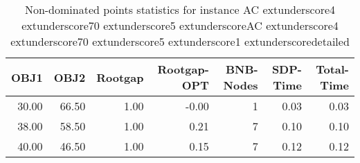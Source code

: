\begin{table}
\caption{Non-dominated points statistics for instance AC	extunderscore4	extunderscore70	extunderscore5	extunderscoreAC	extunderscore4	extunderscore70	extunderscore5	extunderscore1	extunderscoredetailed}
\label{tab:stats/AC_4_70_5_AC_4_70_5_1_detailed}
\begin{tabular}{rrrrrrr}
\toprule
OBJ1 & OBJ2 & Rootgap & Rootgap-OPT & BNB-Nodes & SDP-Time & Total-Time \\
\midrule
30.00 & 66.50 & 1.00 & -0.00 & 1 & 0.03 & 0.03 \\
38.00 & 58.50 & 1.00 & 0.21 & 7 & 0.10 & 0.10 \\
40.00 & 46.50 & 1.00 & 0.15 & 7 & 0.12 & 0.12 \\
\bottomrule
\end{tabular}
\end{table}
